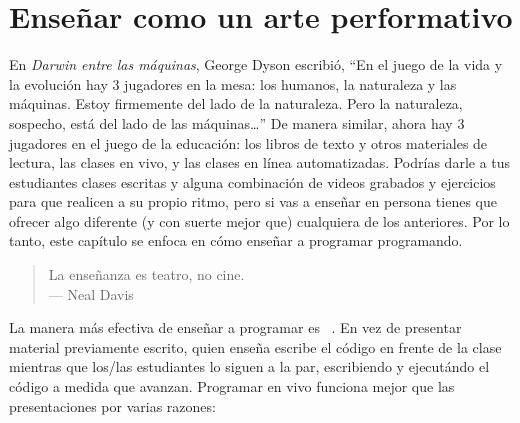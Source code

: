 \chapter{Enseñar como un arte performativo}\label{s:performance}

En \emph{Darwin entre las máquinas},
George Dyson escribió,
``En el juego de la vida y la evolución hay 3 jugadores en la mesa:
los humanos, la naturaleza y las máquinas.
Estoy firmemente del lado de la naturaleza.
Pero la naturaleza, sospecho, está del lado de las máquinas{\ldots}''
De manera similar, ahora hay 3 jugadores en el juego de la educación:
los libros de texto y otros materiales de lectura,
las clases en vivo,
y las clases en línea automatizadas.
Podrías darle a tus estudiantes clases escritas y alguna combinación
de videos grabados y ejercicios para que realicen a su propio ritmo,
pero si vas a enseñar en persona tienes
que ofrecer algo diferente (y con suerte mejor que) cualquiera de los anteriores.
Por lo tanto, este capítulo se enfoca en cómo enseñar a programar programando.


\begin{quote}

  La enseñanza es teatro, no cine. \\
  --- Neal Davis

\end{quote}

La manera más efectiva de enseñar a programar es ~\cite{Rubi2013,Haar2017,Raj2018}.
En vez de presentar material previamente escrito,
quien enseña escribe el código en frente de la clase
mientras que los/las estudiantes lo siguen a la par,
escribiendo y ejecutándo el código a medida que avanzan.
Programar en vivo funciona mejor que las presentaciones por varias razones:


